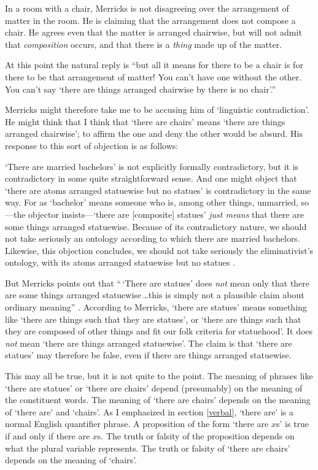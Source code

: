 \documentclass[11pt]{article}
\newenvironment{squote}{%
\begin{spacing}{1}
       	\begin{list}{}{%
\setlength{\labelwidth}{0pt}%
\rightmargin\leftmargin%
}
\item\relax
}{%
\end{list}%
\end{spacing}
}
\begin{document}
\begin{spacing}{1.25}
In a room with a chair, Merricks is not disagreeing over the
arrangement of matter in the room.  He is claiming that the
arrangement does not compose a chair.  He agrees even that the matter
is arranged chairwise, but will not admit that {\em composition}
occurs, and that there is a {\em thing} made up of the matter.

At this point the natural reply is ``but all it means for there to be
a chair is for there to be that arrangement of matter!  You can't have
one without the other.  You can't say `there are things arranged
chairwise by there is no chair'.''

Merricks might therefore take me to be accusing him of `linguistic
contradiction'.  He might think that I think that `there are chairs'
means `there are things arranged chairwise'; to affirm the one and
deny the other would be absurd.  His response to this sort of
objection is as follows:

\begin{squote}
`There are married bachelors' is not explicitly formally
  contradictory, but it is contradictory in some quite straightforward
  sense.  And one might object that `there are atoms arranged
  statuewise but no statues' is contradictory in the same way.  For as
  `bachelor' means someone who is, among other things, unmarried,
  so---the objector insists---`there are [composite] statues' {\em
    just means} that there are some things arranged statuewise.
  Because of its contradictory nature, we should not take seriously an
  ontology according to which there are married bachelors.  Likewise,
  this objection concludes, we should not take seriously the
  eliminativist's ontology, with its atoms arranged statuewise but no
  statues \citeyearpar[13]{merricks2001a}.
\end{squote}

But Merricks points out that ``\,`There are statues' does {\em not}
mean only that there are some things arranged statuewise\,\ldots this
is simply not a plausible claim about ordinary meaning''
\citeyearpar[13]{merricks2001a}.  According to Merricks, `there are
statues' means something like `there are things such that they are
statues', or `there are things such that they are composed of other
things and fit our folk criteria for statuehood'.  It does {\em not}
mean `there are things arranged statuewise'.  The claim is that `there
are statues' may therefore be false, even if there are things arranged
statuewise.

This may all be true, but it is not quite to the point.  The meaning
of phrases like `there are statues' or `there are chairs' depend
(presumably) on the meaning of the constituent words.  The meaning of
`there are chairs' depends on the meaning of `there are' and `chairs'.
As I emphasized in section \ref{verbal}, `there are' is a normal
English quantifier phrase.  A proposition of the form `there are $x$s'
is true if and only if there are $x$s.  The truth or falsity of the
proposition depends on what the plural variable represents.  The truth
or falsity of `there are chairs' depends on the meaning of `chairs'.


\end{spacing}
\end{document}
